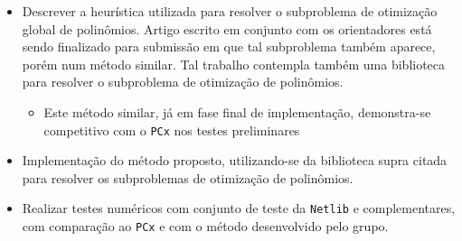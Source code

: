 \begin{itemize}
\item Descrever a heurística utilizada para resolver o subproblema de otimização
global de polinômios. Artigo escrito em conjunto com os orientadores está sendo
finalizado para submissão em que tal subproblema também aparece, porém num
método similar. Tal trabalho contempla também uma biblioteca para resolver o
subproblema de otimização de polinômios.
\begin{itemize}
  \item Este método similar, já em fase final de implementação,
  demonstra-se competitivo com o \texttt{PCx} nos testes preliminares
 \end{itemize}
\item Implementação do método proposto, utilizando-se da biblioteca supra
citada para resolver os subproblemas de otimização de polinômios.
\item Realizar  testes
numéricos com conjunto de teste da \texttt{Netlib} e complementares, com
comparação ao \texttt{PCx} e com o método desenvolvido pelo grupo.
\end{itemize}


